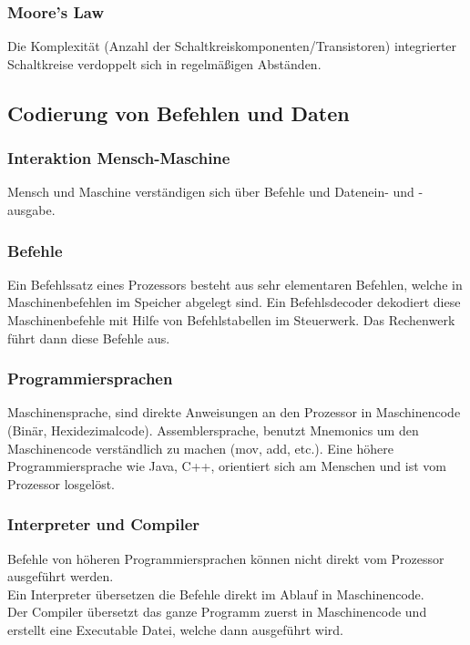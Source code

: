 \documentclass{article}
\begin{document}
\begin{adjustwidth}{2em}{2em}
\begin{adjustwidth}{2em}{2em}
\begin{adjustwidth}{1em}{}
				\subsubsection{Moore's Law}
				\begin{adjustwidth}{1em}{}
					Die Komplexität (Anzahl der Schaltkreiskomponenten/Transistoren) integrierter Schaltkreise verdoppelt sich in regelmäßigen Abständen.
				\end{adjustwidth}
			\end{adjustwidth}
			\subsection{Codierung von Befehlen und Daten}
			\begin{adjustwidth}{1em}{}
				\subsubsection{Interaktion Mensch-Maschine}
				\begin{adjustwidth}{1em}{}
					Mensch und Maschine verständigen sich über Befehle und Datenein- und -ausgabe.
				\end{adjustwidth}
				\subsubsection{Befehle}
				\begin{adjustwidth}{1em}{}
					Ein Befehlssatz eines Prozessors besteht aus sehr elementaren Befehlen, welche in Maschinenbefehlen im Speicher abgelegt sind. Ein Befehlsdecoder dekodiert diese Maschinenbefehle mit Hilfe von Befehlstabellen im Steuerwerk. Das Rechenwerk führt dann diese Befehle aus.
				\end{adjustwidth}
				\subsubsection{Programmiersprachen}
				\begin{adjustwidth}{1em}{}
					Maschinensprache, sind direkte Anweisungen an den Prozessor in Maschinencode (Binär, Hexidezimalcode).
					Assemblersprache, benutzt Mnemonics um den Maschinencode verständlich zu machen (mov, add, etc.).
					Eine höhere Programmiersprache wie Java, C++, orientiert sich am Menschen und ist vom Prozessor losgelöst.
				\end{adjustwidth}
				\subsubsection{Interpreter und Compiler}
				\begin{adjustwidth}{1em}{}
					Befehle von höheren Programmiersprachen können nicht direkt vom Prozessor ausgeführt werden. \\
					Ein Interpreter übersetzen die Befehle direkt im Ablauf in Maschinencode. \\
					Der Compiler übersetzt das ganze Programm zuerst in Maschinencode und erstellt eine Executable Datei, welche dann ausgeführt wird.
				\end{adjustwidth}

\end{adjustwidth}
\end{adjustwidth}
\end{adjustwidth}
\end{document}
